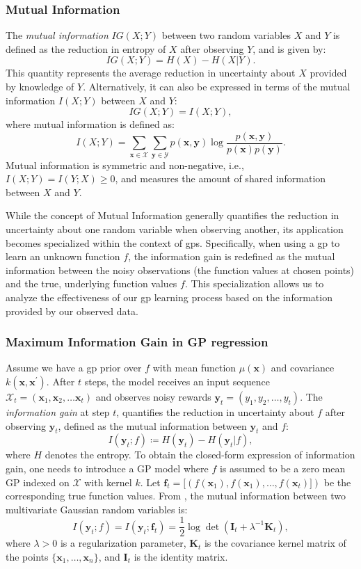 \subsubsection{Mutual Information}

The \textit{mutual information} $IG(X; Y)$ between two random variables $X$ and $Y$ is defined as the reduction in entropy of $X$ after observing $Y$, and is given by:
\[
IG(X; Y) = H(X) - H(X \vert Y).
\]
This quantity represents the average reduction in uncertainty about $X$ provided by knowledge of $Y$. Alternatively, it can also be expressed in terms of the mutual information $I(X; Y)$ between $X$ and $Y$:
\[
IG(X; Y) = I(X; Y),
\]
where mutual information is defined as:
\[
I(X; Y) = \sum_{\mathbf{x} \in \mathcal{X}} \sum_{\mathbf{y} \in \mathcal{Y}} p(\mathbf{x}, \mathbf{y}) \log \frac{p(\mathbf{x}, \mathbf{y})}{p(\mathbf{x}) p(\mathbf{y})}.
\]
Mutual information is symmetric and non-negative, i.e., $I(X; Y) = I(Y; X) \geq 0$, and measures the amount of shared information between $X$ and $Y$.

While the concept of Mutual Information generally quantifies the reduction in uncertainty about one random variable when observing another, its application becomes specialized within the context of \acp{gp}. Specifically, when using a \ac{gp} to learn an unknown function $f$, the information gain is redefined as the mutual information between the noisy observations (the function values at chosen points) and the true, underlying function values $f$. This specialization allows us to analyze the effectiveness of our \ac{gp} learning process based on the information provided by our observed data. 
\subsubsection{Maximum Information Gain in GP regression}

Assume we have a \ac{gp} prior over \( f \) with mean function \( \mu(\mathbf{x}) \) and covariance \( k(\mathbf{x}, \mathbf{x}^\prime) \). After $t$ steps, the model receives an input sequence $\mathcal{X}_t = (\mathbf{x}_1, \mathbf{x}_2, \dots  \mathbf{x}_t)$ and observes noisy rewards $\mathbf{y}_t = (y_1, y_2, \dots, y_t)$. The \emph{information gain} at step $t$, quantifies the reduction in uncertainty about $f$ after observing $\mathbf{y}_t$, defined as the mutual information between  $\mathbf{y}_t$ and $f$:
\[
I(\mathbf{y}_t; f) \coloneqq  H(\mathbf{y}_t) - H(\mathbf{y}_t \rvert f), 
\]
where $H$ denotes the entropy. To obtain the closed-form expression of information gain, one needs to introduce a GP model where $f$ is assumed to be a zero mean GP indexed on $\mathcal X$ with kernel $k$. Let $\mathbf{f}_t = [\left(f(\mathbf{x}_1), f(\mathbf{x}_1), \dots, f(\mathbf{x}_t)] \right)$ be the corresponding true function values.  From \citet{cover1999elements}, the mutual information between two multivariate Gaussian random variables is: 
\[ I(\mathbf{y}_t; f) = I(\mathbf{y}_t; \mathbf{f}_t) = \frac{1}{2} \log \det (\mathbf{I}_t + \lambda^{-1}\mathbf{K}_t), \]
where $\lambda > 0$ is a regularization parameter, $\mathbf{K}_t$ is the covariance kernel matrix of the points \( \{\mathbf{x}_1, \dots, \mathbf{x}_n\} \),
and \( \mathbf{I}_t \) is the identity matrix.


